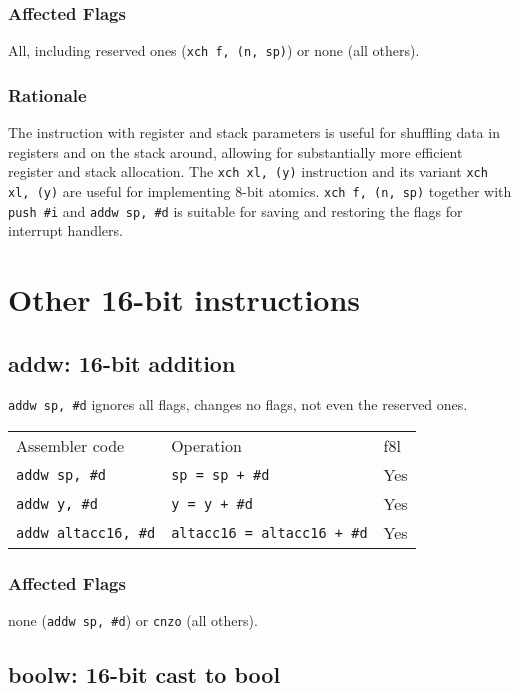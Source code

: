 \documentclass{book}
\begin{document}
\subsubsection*{Affected Flags}

All, including reserved ones (\texttt{xch f, (n, sp)}) or none (all others).

\subsubsection*{Rationale}

The instruction with register and stack parameters is useful for shuffling data in registers and on the stack around, allowing for substantially more efficient register and stack allocation. The \texttt{xch xl, (y)} instruction and its variant \texttt{xch xl, (y)} are useful for implementing 8-bit atomics. \texttt{xch f, (n, sp)} together with \texttt{push \#i} and \texttt{addw sp, \#d} is suitable for saving and restoring the flags for interrupt handlers.

\section{Other 16-bit instructions}

\subsection{addw: 16-bit addition}

\texttt{addw sp, \#d} ignores all flags, changes no flags, not even the reserved ones.

\begin{tabular}{l l l}
Assembler code              & Operation                          & f8l \\
\texttt{addw sp, \#d}       & \texttt{sp = sp + \#d}             & Yes \\
\texttt{addw y, \#d}        & \texttt{y = y + \#d}               & Yes \\
\texttt{addw altacc16, \#d} & \texttt{altacc16 = altacc16 + \#d} & Yes
\end{tabular}

\subsubsection*{Affected Flags}

none (\texttt{addw sp, \#d}) or \texttt{cnzo} (all others).


\subsection{boolw: 16-bit cast to bool}
\end{document}
